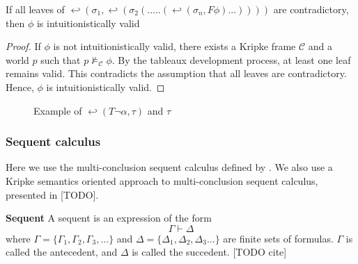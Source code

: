 \documentclass[runningheads]{llncs}
\begin{document}
    \begin{theorem}
        If all leaves of $ \hookleftarrow (\sigma_1,\hookleftarrow(\sigma_2(.....(\hookleftarrow(\sigma_n , F\phi)...)))) $ are contradictory, then 
        $\phi$ is intuitionistically valid
    \end{theorem}
    \begin{proof}
    If $\phi$ is not intuitionistically valid, there exists a Kripke frame $\mathcal{C}$ and a world $p$ such that $p \nvDash_{\mathcal{C}} \phi$. By the tableaux development process, at least one leaf remains valid. This contradicts the assumption that all leaves are contradictory. Hence, $\phi$ is intuitionistically valid.   \end{proof}
\begin{figure}
\centering
{}
\caption{Example of $\hookleftarrow(T \neg \alpha ,\tau)$ and $\tau$ } 
\label{fig:tree_expansion}
\end{figure}

\subsubsection{Sequent calculus}
    Here we use the multi-conclusion sequent calculus defined by \cite{book2}. 
    We also use a Kripke semantics oriented approach to multi-conclusion sequent calculus, presented in \cite{book3} [TODO].
    
\begin {definition}
    \textbf{Sequent} A sequent is an expression of the form 
    \[
    \Gamma \vdash \Delta
    \]
    where $\Gamma = \{\Gamma_1, \Gamma_2, \Gamma_3,...\}$ and $\Delta = \{\Delta_1,\Delta_2,\Delta_3 ...\}$
     are  finite sets of formulas. $\Gamma $ is called the antecedent, and 
    $\Delta$ is called the succedent. [TODO cite]
\end {definition}
\end{document}
